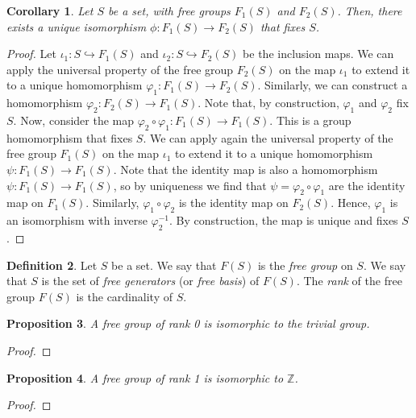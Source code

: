 \documentclass[a4paper, openany]{memoir}
\theoremstyle{definition}
\newtheorem{definition}{Definition}[section]
\theoremstyle{plain}
\newtheorem{proposition}[definition]{Proposition}
\newtheorem{corollary}[definition]{Corollary}
\begin{document}
    \begin{corollary}
        Let $S$ be a set, with free groups $F_1(S)$ and $F_2(S)$. Then, there exists a unique isomorphism $\phi \colon F_1(S) \to F_2(S)$ that fixes $S$.
    \end{corollary}
    \begin{proof}
        Let $\iota_1 \colon S \hookrightarrow F_1(S)$ and $\iota_2 \colon S \hookrightarrow F_2(S)$ be the inclusion maps. We can apply the universal property of the free group $F_2(S)$ on the map $\iota_1$ to extend it to a unique homomorphism $\varphi_1 \colon F_1(S) \to F_2(S)$. Similarly, we can construct a homomorphism $\varphi_2 \colon F_2(S) \to F_1(S)$. Note that, by construction, $\varphi_1$ and $ \varphi_2$ fix $S$. Now, consider the map $\varphi_2 \circ \varphi_1 \colon F_1(S) \to F_1(S)$. This is a group homomorphism that fixes $S$. We can apply again the universal property of the free group $F_1(S)$ on the map $\iota_1$ to extend it to a unique homomorphism $\psi \colon F_1(S) \to F_1(S)$. Note that the identity map is also a homomorphism $\psi \colon F_1(S) \to F_1(S)$, so by uniqueness we find that $\psi = \varphi_2 \circ \varphi_1$ are the identity map on $F_1(S)$. Similarly, $\varphi_1 \circ \varphi_2$ is the identity map on $F_2(S)$. Hence, $\varphi_1$ is an isomorphism with inverse $\varphi_2^{-1}$. By construction, the map is unique and fixes $S$.
    \end{proof}
    
    \begin{definition}
        Let $S$ be a set. We say that $F(S)$ is the \emph{free group} on $S$. We say that $S$ is the set of \emph{free generators} (or \emph{free basis}) of $F(S)$. The \emph{rank} of the free group $F(S)$ is the cardinality of $S$.
    \end{definition}

    \begin{proposition}
        A free group of rank 0 is isomorphic to the trivial group.
    \end{proposition}
    \begin{proof}
        
    \end{proof}
    
    \begin{proposition}
        A free group of rank 1 is isomorphic to $\mathbb{Z}$.
    \end{proposition}
    \begin{proof}
        
    \end{proof}
\end{document}
